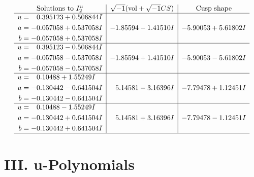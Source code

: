 \documentclass[1p]{elsarticle_modified}
\theoremstyle{definition}
\newcommand{\I}{\sqrt{-1}}
\begin{document}
$$\begin{array}{c|c|c}  
\text{Solutions to }I^u_{2}& \I (\text{vol} + \sqrt{-1}CS) & \text{Cusp shape}\\
 \hline 
\begin{aligned}
u &= \phantom{-}0.395123 + 0.506844 I \\
a &= -0.057058 + 0.537058 I \\
b &= -0.057058 + 0.537058 I\end{aligned}
 & -1.85594 - 1.41510 I & -5.90053 + 5.61802 I \\ \hline\begin{aligned}
u &= \phantom{-}0.395123 - 0.506844 I \\
a &= -0.057058 - 0.537058 I \\
b &= -0.057058 - 0.537058 I\end{aligned}
 & -1.85594 + 1.41510 I & -5.90053 - 5.61802 I \\ \hline\begin{aligned}
u &= \phantom{-}0.10488 + 1.55249 I \\
a &= -0.130442 - 0.641504 I \\
b &= -0.130442 - 0.641504 I\end{aligned}
 & \phantom{-}5.14581 - 3.16396 I & -7.79478 + 1.12451 I \\ \hline\begin{aligned}
u &= \phantom{-}0.10488 - 1.55249 I \\
a &= -0.130442 + 0.641504 I \\
b &= -0.130442 + 0.641504 I\end{aligned}
 & \phantom{-}5.14581 + 3.16396 I & -7.79478 - 1.12451 I\\
 \hline 
 \end{array}$$\newpage
\newpage\renewcommand{\arraystretch}{1}
\centering \section*{ III. u-Polynomials}
\end{document}
